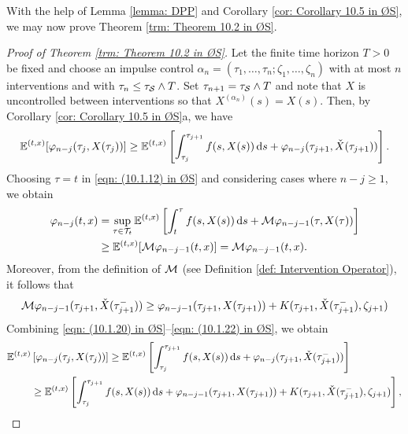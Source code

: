 With the help of Lemma \ref{lemma: DPP} and Corollary \ref{cor: Corollary 10.5 in ØS}, we may now prove Theorem \ref{trm: Theorem 10.2 in ØS}.

\begin{proof}[Proof of Theorem \ref{trm: Theorem 10.2 in ØS}]
    Let the finite time horizon $T>0$ be fixed and choose an impulse control $\alpha_n = (\tau_1, \ldots, \tau_n; \zeta_1, \ldots, \zeta_n)$ with at most $n$ interventions and with $\tau_n \leq \tau_{\mathcal{S}} \wedge T$. Set $\tau_{n+1} = \tau_{\mathcal{S}} \wedge T$ and note that $X$ is uncontrolled between interventions so that $X^{(\alpha_n)}(s)=X(s)$. Then, by Corollary \ref{cor: Corollary 10.5 in ØS}a, we have
    \begin{equation}
        \mathbb{E}^{(t,x)} [\varphi_{n-j}(\tau_j, X(\tau_j))] \geq \mathbb{E}^{(t,x)} \left[ \int_{\tau_j}^{\tau_{j+1}} f(s,X(s)) \,\mathrm{d} s + \varphi_{n-j}(\tau_{j+1}, \check{X}(\tau_{j+1})) \right].
        \label{eqn: (10.1.20) in ØS}
    \end{equation}
    Choosing $\tau=t$ in \eqref{eqn: (10.1.12) in ØS} and considering cases where $n-j \geq 1$, we obtain
    \begin{align}
        \varphi_{n-j}(t,x) &= \sup_{\tau \in \mathcal{T}_t}\mathbb{E}^{(t,x)} \left[ \int_t^\tau f(s,X(s)) \,\mathrm{d} s + \mathcal{M} \varphi_{n-j-1} (\tau, X(\tau)) \right] \nonumber \\
        &\geq \mathbb{E}^{(t,x)} [\mathcal{M} \varphi_{n-j-1} (t,x)] = \mathcal{M} \varphi_{n-j-1} (t,x).
        \label{eqn: (10.1.21) in ØS}
    \end{align}
    Moreover, from the definition of $\mathcal{M}$ (see Definition \ref{def: Intervention Operator}), it follows that
    \begin{equation}
        \mathcal{M} \varphi_{n-j-1}(\tau_{j+1}, \check{X}(\tau_{j+1}^-)) \geq  \varphi_{n-j-1}(\tau_{j+1},X(\tau_{j+1})) + K(\tau_{j+1},\check{X}(\tau_{j+1}^-), \zeta_{j+1})
        \label{eqn: (10.1.22) in ØS}
    \end{equation}
    Combining \eqref{eqn: (10.1.20) in ØS}--\eqref{eqn: (10.1.22) in ØS},  we obtain
    \begin{align}
        \mathbb{E}^{(t,x)} & \left[ \varphi_{n-j}(\tau_j, X(\tau_j)) \right] \geq 
        \mathbb{E}^{(t,x)} \left[ \int_{\tau_j}^{\tau_{j+1}} f(s,X(s)) \,\mathrm{d} s + \varphi_{n-j}(\tau_{j+1}, \check{X}(\tau_{j+1}^-)) \right] \nonumber \\
        & \geq \mathbb{E}^{(t,x)} \left[ \int_{\tau_j}^{\tau_{j+1}} f(s,X(s)) \,\mathrm{d} s + \varphi_{n-j-1}(\tau_{j+1},X(\tau_{j+1})) + K(\tau_{j+1},\check{X}(\tau_{j+1}^-), \zeta_{j+1}) \right],
    \end{align}

\end{proof}
